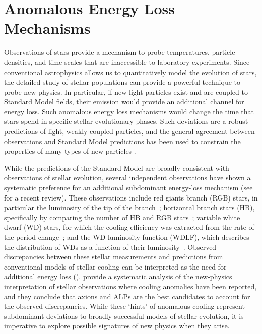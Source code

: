 \section{Anomalous Energy Loss Mechanisms}
\label{sec:cooling}

Observations of stars provide a mechanism to probe temperatures, particle densities, and time scales that are inaccessible to laboratory experiments.
Since conventional astrophysics allows us to quantitatively model the evolution of stars, the detailed study of stellar populations can provide a powerful technique to probe new physics.
In particular, if new light particles exist and are coupled to Standard Model fields, their emission would provide an additional channel for energy loss. 
Such anomalous energy loss mechanisms would change the time that stars spend in specific stellar evolutionary phases.
Such deviations are a robust predictions of light, weakly coupled particles, and the general agreement between observations and Standard Model predictions has been used to constrain the properties of many types of new particles \citep{hep-ph/0611350, 1210.1271, 1302.3884, 1305.2920, 1611.03864, 1611.05852, 1803.00993}.

While the predictions of the Standard Model are broadly consistent with observations of stellar evolution, several independent observations have shown a systematic preference for an additional subdominant energy-loss mechanism (see \citealt{Giannotti:2017hny} for a recent review).
These observations include red giants branch (RGB) stars, in particular the luminosity of the tip of the branch~\citep{Viaux:2013lha,Viaux:2013hca}; 
horizontal branch stars (HB), specifically by comparing the number of HB and RGB stars~\citep{Ayala:2014,Straniero:2015nvc};
variable white dwarf (WD) stars, for which the cooling efficiency was extracted from the rate of the period change~\citep{KeplerEtAl,Isern:1992gia,BischoffKim:2007ve,Corsico:2012ki,Corsico:2012sh,Corsico:2014mpa,Corsico:2016okh,Battich:2016htm}; 
and the WD luminosity function (WDLF), which describes the distribution of WDs as a function of their luminosity~\citep{Isern:2008nt,Bertolami:2014wua,Isern:2018uce}.
Observed discrepancies between these stellar measurements and predictions from conventional models of stellar cooling can be interpreted as the need for additional energy loss ().
\cite{Giannotti:2015kwo} provide a systematic analysis of the new-physics interpretation of stellar observations  where cooling anomalies have been reported, and they conclude that axions and ALPs are the best candidates to account for the observed discrepancies. 
While these `hints' of anomalous cooling represent subdominant deviations to broadly successful models of stellar evolution, it is imperative to explore possible signatures of new physics when they arise.

